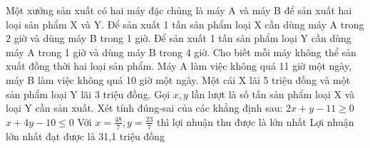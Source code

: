 \begin{ex}
 Một xưởng sản xuất có hai máy đặc chủng là máy A và máy B để sản xuất hai loại sản phẩm X và Y. Để sản xuất 1 tấn sản phẩm loại X cần dùng máy A trong 2 giờ và dùng máy B trong 1 giờ. Để sản xuất 1 tấn sản phẩm loại Y cần dùng máy A trong 1 giờ và dùng máy B trong 4 giờ. Cho biết mỗi máy không thể sản xuất đồng thời hai loại sản phẩm. Máy A làm việc không quá 11 giờ một ngày, máy B làm việc không quá 10 giờ một ngày. Một cái X lãi 5 triệu đồng và một sản phẩm loại Y lãi 3 triệu đồng. Gọi ${x,y}$ lần lượt là số tấn sản phẩm loại X và loại Y cần sản xuất. Xét tính đúng-sai của các khẳng định sau:
\choiceTFt
{ $2 x + y - 11 \ge 0$ }
   { \True  $x + 4 y - 10 \le 0$ }
     { Với $x = \frac{48}{7}, y = \frac{23}{7}$ thì lợi nhuận thu được là lớn nhất }
    { Lợi nhuận lớn nhất đạt được là 31,1 triệu đồng  }
\end{ex}

